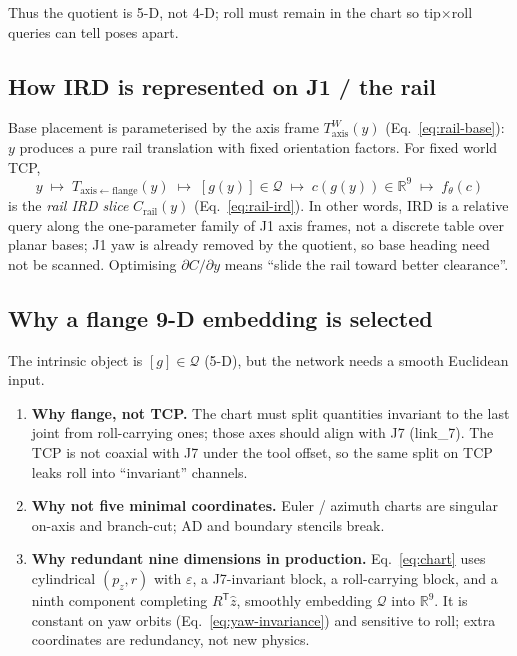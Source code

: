\documentclass[11pt,a4paper]{article}
\newcommand{\R}{\mathbb{R}}
\newcommand{\Taxis}{T_{\mathrm{axis}}}
\begin{document}
Thus the quotient is 5-D, not 4-D; roll must remain in the chart so tip$\times$roll
queries can tell poses apart.

\subsection{How IRD is represented on J1 / the rail}
\label{sec:ird-on-j1}

Base placement is parameterised by the axis frame \(\Taxis^{W}(y)\)
(Eq.~\eqref{eq:rail-base}): \(y\) produces a pure rail translation with fixed
orientation factors. For fixed world TCP,
\[
  y \;\mapsto\; T_{\mathrm{axis\leftarrow flange}}(y)
  \;\mapsto\; [g(y)]\in\mathcal{Q}
  \;\mapsto\; c(g(y))\in\R^{9}
  \;\mapsto\; f_{\theta}(c)
\]
is the \emph{rail IRD slice} \(C_{\mathrm{rail}}(y)\) (Eq.~\eqref{eq:rail-ird}).
In other words, IRD is a relative query along the one-parameter family of J1
axis frames, not a discrete table over planar bases; J1 yaw is already removed
by the quotient, so base heading need not be scanned. Optimising
\(\partial C/\partial y\) means ``slide the rail toward better clearance''.

\subsection{Why a flange 9-D embedding is selected}
\label{sec:why-flange-9d}

The intrinsic object is \([g]\in\mathcal{Q}\) (5-D), but the network needs a
smooth Euclidean input.

\begin{enumerate}[leftmargin=1.6em]
  \item \textbf{Why flange, not TCP.}
        The chart must split quantities invariant to the last joint from
        roll-carrying ones; those axes should align with J7 (link\_7). The TCP
        is not coaxial with J7 under the tool offset, so the same split on TCP
        leaks roll into ``invariant'' channels.
  \item \textbf{Why not five minimal coordinates.}
        Euler / azimuth charts are singular on-axis and branch-cut; AD and
        boundary stencils break.
  \item \textbf{Why redundant nine dimensions in production.}
        Eq.~\eqref{eq:chart} uses cylindrical \((p_{z},r)\) with \(\varepsilon\),
        a J7-invariant block, a roll-carrying block, and a ninth component
        completing \(R^{\mathsf T}\hat z\), smoothly embedding \(\mathcal{Q}\)
        into \(\R^{9}\). It is constant on yaw orbits
        (Eq.~\eqref{eq:yaw-invariance}) and sensitive to roll; extra coordinates
        are redundancy, not new physics.
\end{enumerate}
\end{document}
